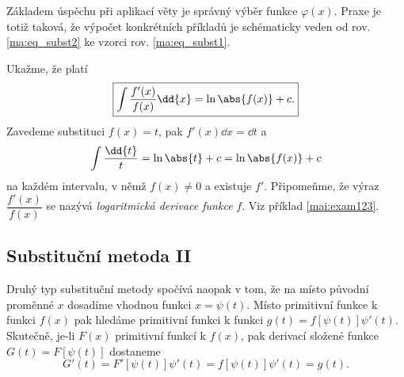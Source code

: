       Základem úspěchu při aplikací věty je správný výběr funkce $\varphi(x)$. Praxe je totiž
      taková, že výpočet konkrétních příkladů je schématicky veden od rov. \ref{ma:eq_subst2} ke
      vzorci rov. \ref{ma:eq_subst1}.

      

      

      

      

      

      Ukažme, že platí 
      \begin{equation}\label{mai:eq139}
        \boxed{\int{\dfrac{f'(x)}{f(x)}}\dd{x} = \ln\abs{f(x)} + c.}
      \end{equation}
      Zavedeme substituci \(f(x) =t\), pak \(f'(x)\dd{x} = \dd{t}\) a 
      \begin{equation*}
        \int{\dfrac{\dd{t}}{t}} = \ln\abs{t} + c = \ln\abs{f(x)} + c
      \end{equation*}
      na každém intervalu, v němž \(f(x)\neq 0\) a existuje \(f'\). Připomeňme, že výraz
      \(\dfrac{f'(x)}{f(x)}\) se nazývá \emph{logaritmická derivace funkce} \(f\). Viz příklad
      \ref{mai:exam123}.
   

    \newpage
    \subsection{Substituční metoda II}
      Druhý typ substituční metody spočívá naopak v tom, že na místo původní proměnné \(x\) 
      dosadíme vhodnou funkci \(x = \psi(t)\). Místo primitivní funkce k funkci \(f(x)\) pak 
      hledáme primitivní funkci k funkci \(g(t) = f[\psi(t)]\psi'(t)\). Skutečně, je-li \(F(x)\) 
      primitivní funkcí k \(f(x)\), pak derivací složené funkce \(G(t) = F[\psi(t)]\) dostaneme
      \begin{equation*}
       G'(t) = F'[\psi(t)]\psi'(t) = f[\psi(t)]\psi'(t) = g(t).
      \end{equation*}


